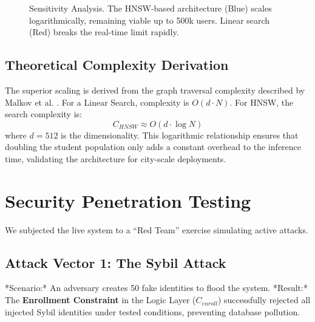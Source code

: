 \documentclass[conference]{IEEEtran}
\begin{document}
\begin{figure}[htbp]
\centering
{}
\caption{Sensitivity Analysis. The HNSW-based architecture (Blue) scales logarithmically, remaining viable up to 500k users. Linear search (Red) breaks the real-time limit rapidly.}
\label{fig:scaling}
\end{figure}

\subsection{Theoretical Complexity Derivation}
The superior scaling is derived from the graph traversal complexity described by Malkov et al. \cite{b15}. For a Linear Search, complexity is $O(d \cdot N)$. For HNSW, the search complexity is:
\begin{equation}
C_{HNSW} \approx O(d \cdot \log N)
\end{equation}
where $d=512$ is the dimensionality. This logarithmic relationship ensures that doubling the student population only adds a constant overhead to the inference time, validating the architecture for city-scale deployments.

\section{Security Penetration Testing}
We subjected the live system to a ``Red Team'' exercise simulating active attacks.

\subsection{Attack Vector 1: The Sybil Attack}
*Scenario:* An adversary creates 50 fake identities to flood the system.
*Result:* The \textbf{Enrollment Constraint} in the Logic Layer ($C_{enroll}$) successfully rejected all injected Sybil identities under tested conditions, preventing database pollution.
\end{document}
